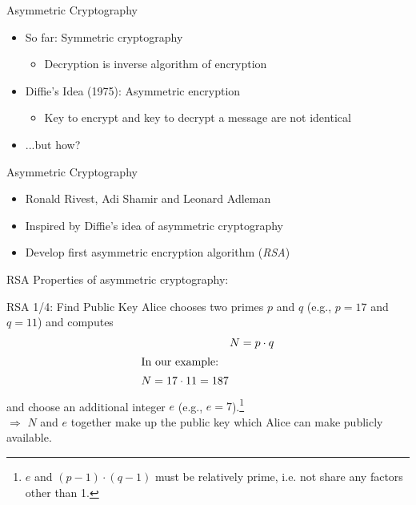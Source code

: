 \documentclass[handout]{beamer}
\begin{document}
\begin{frame}{Asymmetric Cryptography}
	\begin{itemize}
		\item<1-> So far: Symmetric cryptography
		\begin{itemize}
			\item<1->Decryption is inverse algorithm of encryption
		\end{itemize}
		\item<2-> Diffie's Idea (1975): Asymmetric encryption
		\begin{itemize}
			\item<2->Key to encrypt and key to decrypt a message are not identical
		\end{itemize}
		\item<3->...but how?
	\end{itemize}
\end{frame}

\begin{frame}{Asymmetric Cryptography}
	\begin{itemize}
		\item<1-> Ronald Rivest, Adi Shamir and Leonard Adleman
		\item<2-> Inspired by Diffie's idea of asymmetric cryptography
		\item<3-> Develop first asymmetric encryption algorithm (\textit{RSA}) \cite{rivest1978}
	\end{itemize}
\end{frame}

\begin{frame}{RSA}
	Properties of asymmetric cryptography:
	\vspace{0.4cm}
	\begin{figure}
		\centering
		
	\end{figure}
\end{frame}

\begin{frame}{RSA 1/4: Find Public Key}
	Alice chooses two primes $p$ and $q$ (e.g., $p = 17$ and $q = 11$) and computes
	\begin{align*}
		N &= p \cdot q \\
		\intertext{In our example:}
		\begin{split}
			N &= 17 \cdot 11 = 187 
		\end{split}
	\end{align*} 
	and choose an additional integer $e$ (e.g., $e = 7$).\footnote{\tiny $e$ and $(p-1)\cdot(q-1)$ must be relatively prime, i.e. not share any factors other than 1.} \\
	\vspace{0.5cm}
	$\Rightarrow$ $N$ and $e$ together make up the public key which Alice can make publicly available.
\end{frame}
\end{document}
